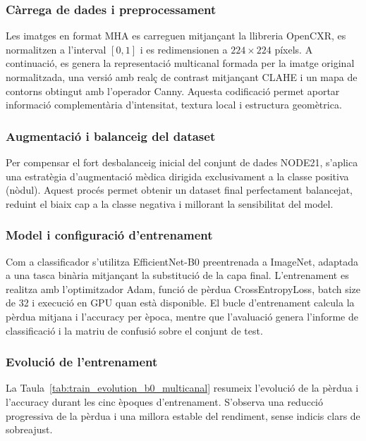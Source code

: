 \documentclass[conference]{IEEEtran}
\begin{document}
\subsubsection{Càrrega de dades i preprocessament}

Les imatges en format MHA es carreguen mitjançant la llibreria OpenCXR, es normalitzen
a l’interval $[0,1]$ i es redimensionen a $224 \times 224$ píxels. A continuació, es genera
la representació multicanal formada per la imatge original normalitzada, una versió amb
realç de contrast mitjançant CLAHE i un mapa de contorns obtingut amb l’operador Canny.
Aquesta codificació permet aportar informació complementària d’intensitat, textura local
i estructura geomètrica.

\subsubsection{Augmentació i balanceig del dataset}

Per compensar el fort desbalanceig inicial del conjunt de dades NODE21, s’aplica una
estratègia d’augmentació mèdica dirigida exclusivament a la classe positiva (nòdul).
Aquest procés permet obtenir un dataset final perfectament balancejat, reduint el biaix
cap a la classe negativa i millorant la sensibilitat del model.

\subsubsection{Model i configuració d’entrenament}

Com a classificador s’utilitza EfficientNet-B0 preentrenada a ImageNet, adaptada a una
tasca binària mitjançant la substitució de la capa final. L’entrenament es realitza amb
l’optimitzador Adam, funció de pèrdua CrossEntropyLoss, batch size de 32 i execució
en GPU quan està disponible. El bucle d’entrenament calcula la pèrdua mitjana i
l’accuracy per època, mentre que l’avaluació genera l’informe de classificació i la
matriu de confusió sobre el conjunt de test.

\subsubsection{Evolució de l’entrenament}

La Taula~\ref{tab:train_evolution_b0_multicanal} resumeix l’evolució de la pèrdua i
l’accuracy durant les cinc èpoques d’entrenament. S’observa una reducció progressiva
de la pèrdua i una millora estable del rendiment, sense indicis clars de sobreajust.
\end{document}
